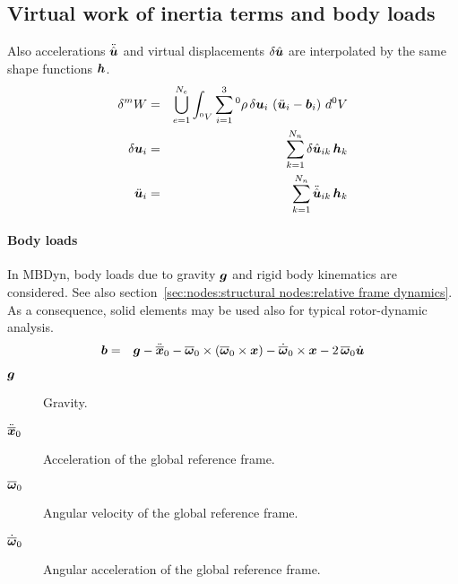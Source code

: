 \subsection{Virtual work of inertia terms and body loads}
Also accelerations $\ddot{\hat{\bm{u}}}$ and virtual displacements $\delta\hat{\bm{u}}$ are interpolated by the same shape functions $\bm{h}$.
\begin{eqnarray}
\delta^{m}W & = & \bigcup_{e=1}^{N_e} \int_{^0V} \sum_{i=1}^3 {^0}\rho \, \delta\bm{u}_i \, \left(\ddot{\bm{u}}_i - \bm{b}_i\right) \, d^0V \label{eq:solid:delta_Wm} \\
\delta\bm{u}_i & = & \sum_{k=1}^{N_n} \delta\hat{\bm{u}}_{ik} \, \bm{h}_k \label{eq:solid:delta_u} \\
\ddot{\bm{u}}_i & = & \sum_{k=1}^{N_n} \ddot{\hat{\bm{u}}}_{ik} \, \bm{h}_k \label{eq:solid:delta_ddotu}
\end{eqnarray}

\paragraph{Body loads}
In MBDyn, body loads due to gravity $\bm{g}$ and rigid body kinematics are considered. See also section~\ref{sec:nodes:structural nodes:relative frame dynamics}.
As a consequence, solid elements may be used also for typical rotor-dynamic analysis.
\begin{eqnarray}
\bm{b} & = & \bm{g} - \ddot{\overline{\bm{x}}}_0 - \overline{\bm{\omega}}_0 \times \left(\overline{\bm{\omega}}_0 \times \bm{x} \right) - \dot{\overline{\bm{\omega}}}_0 \times \bm{x} - 2 \, \overline{\bm{\omega}}_0 \dot{\bm{u}}
\end{eqnarray}

\begin{description}
\item[$\bm{g}$] Gravity.
\item[$\ddot{\overline{\bm{x}}}_0$] Acceleration of the global reference frame.
\item[$\overline{\bm{\omega}}_0$]  Angular velocity of the global reference frame.
\item[$\dot{\overline{\bm{\omega}}}_0$]  Angular acceleration of the global reference frame.
\end{description}

